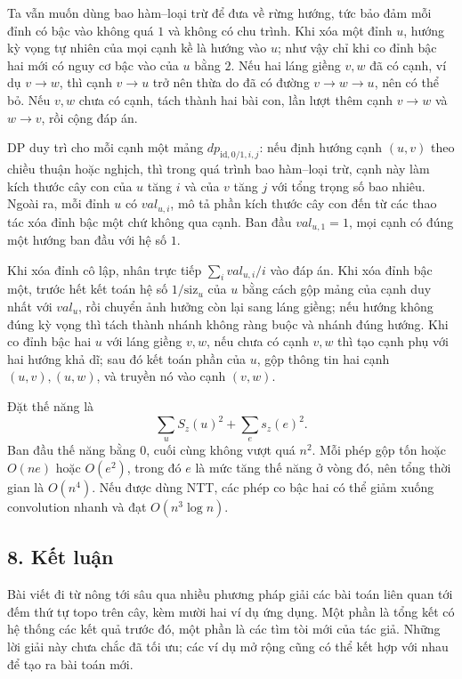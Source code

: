 \documentclass[11pt]{article}
\begin{document}
Ta vẫn muốn dùng bao hàm--loại trừ để đưa về rừng hướng, tức bảo đảm mỗi đỉnh
có bậc vào không quá \(1\) và không có chu trình. Khi xóa một đỉnh \(u\), hướng
kỳ vọng tự nhiên của mọi cạnh kề là hướng vào \(u\); như vậy chỉ khi co đỉnh
bậc hai mới có nguy cơ bậc vào của \(u\) bằng \(2\). Nếu hai láng giềng \(v,w\)
đã có cạnh, ví dụ \(v\to w\), thì cạnh \(v\to u\) trở nên thừa do đã có đường
\(v\to w\to u\), nên có thể bỏ. Nếu \(v,w\) chưa có cạnh, tách thành hai bài
con, lần lượt thêm cạnh \(v\to w\) và \(w\to v\), rồi cộng đáp án.

DP duy trì cho mỗi cạnh một mảng
\(dp_{\mathrm{id},0/1,i,j}\): nếu định hướng cạnh \((u,v)\) theo chiều thuận
hoặc nghịch, thì trong quá trình bao hàm--loại trừ, cạnh này làm kích thước cây
con của \(u\) tăng \(i\) và của \(v\) tăng \(j\) với tổng trọng số bao nhiêu.
Ngoài ra, mỗi đỉnh \(u\) có \(val_{u,i}\), mô tả phần kích thước cây con đến từ
các thao tác xóa đỉnh bậc một chứ không qua cạnh. Ban đầu
\(val_{u,1}=1\), mọi cạnh có đúng một hướng ban đầu với hệ số \(1\).

Khi xóa đỉnh cô lập, nhân trực tiếp \(\sum_i val_{u,i}/i\) vào đáp án. Khi xóa
đỉnh bậc một, trước hết kết toán hệ số \(1/\mathrm{siz}_u\) của \(u\) bằng cách
gộp mảng của cạnh duy nhất với \(val_u\), rồi chuyển ảnh hưởng còn lại sang
láng giềng; nếu hướng không đúng kỳ vọng thì tách thành nhánh không ràng buộc
và nhánh đúng hướng. Khi co đỉnh bậc hai \(u\) với láng giềng \(v,w\), nếu chưa
có cạnh \(v,w\) thì tạo cạnh phụ với hai hướng khả dĩ; sau đó kết toán phần của
\(u\), gộp thông tin hai cạnh \((u,v),(u,w)\), và truyền nó vào cạnh \((v,w)\).

Đặt thế năng là
\[
  \sum_u S_z(u)^2+\sum_e s_z(e)^2.
\]
Ban đầu thế năng bằng \(0\), cuối cùng không vượt quá \(n^2\). Mỗi phép gộp tốn
hoặc \(O(ne)\) hoặc \(O(e^2)\), trong đó \(e\) là mức tăng thế năng ở vòng đó,
nên tổng thời gian là \(O(n^4)\). Nếu được dùng NTT, các phép co bậc hai có thể
giảm xuống convolution nhanh và đạt \(O(n^3\log n)\).

\subsection*{8. Kết luận}

Bài viết đi từ nông tới sâu qua nhiều phương pháp giải các bài toán liên quan
tới đếm thứ tự topo trên cây, kèm mười hai ví dụ ứng dụng. Một phần là tổng kết
có hệ thống các kết quả trước đó, một phần là các tìm tòi mới của tác giả.
Những lời giải này chưa chắc đã tối ưu; các ví dụ mở rộng cũng có thể kết hợp
với nhau để tạo ra bài toán mới.
\end{document}
